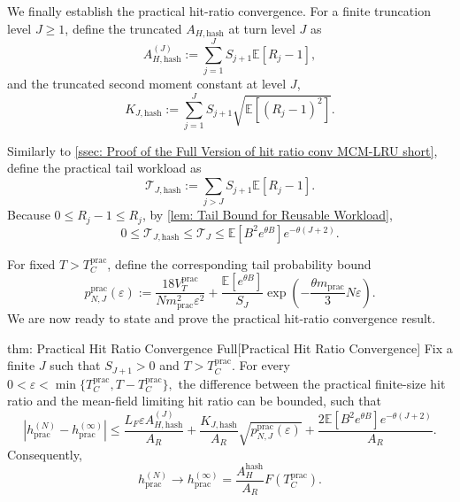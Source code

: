 \documentclass{article}
\theoremstyle{definition}
\newcommand{\E}{\mathbb E}
\begin{document}
We finally establish the practical hit-ratio convergence. For a finite truncation level $J\geq1$, define the truncated $A_{H,\mathrm{hash}}$ at turn level $J$ as 
\begin{equation}
\label{equ: practical truncated AH}
    A_{H,\mathrm{hash}}^{(J)} :=\sum_{j=1}^{J}S_{j+1}\E[R_j-1],
\end{equation}
and the truncated second moment constant at level $J$,
\begin{equation}
\label{equ: practical truncated KJ}
    K_{J,\mathrm{hash}}:=\sum_{j=1}^{J}S_{j+1}\sqrt{\E[(R_j-1)^2]}.
\end{equation}

Similarly to \cref{ssec: Proof of the Full Version of hit ratio conv MCM-LRU short}, define the practical tail workload as
\begin{equation}
\label{equ: practical tail workload}
    \mathcal T_{J,\mathrm{hash}} :=\sum_{j>J}S_{j+1}\E[R_j-1].
\end{equation}
Because $0\leq R_j-1\leq R_j$, by \cref{lem: Tail Bound for Reusable Workload}, 
\begin{equation}
\label{equ: practical tail workload bound}
    0\leq\mathcal T_{J,\mathrm{hash}}\leq\mathcal T_J \leq\E[B^2e^{\theta B}]e^{-\theta(J+2)}.
\end{equation}

For fixed $T>T_C^{\mathrm{prac}}$, define the corresponding tail probability bound 
\begin{equation}
\label{equ: practical pNJ}
    p_{N,J}^{\mathrm{prac}}(\varepsilon) :=\frac{18V_T^{\mathrm{prac}}}{Nm_{\mathrm{prac}}^2\varepsilon^2} + \frac{\E[e^{\theta B}]}{S_J} \exp\left(-\frac{\theta m_{\mathrm{prac}}}{3}N\varepsilon\right).
\end{equation}
We are now ready to state and prove the practical hit-ratio convergence result.

\begin{reptheorem}{thm: Practical Hit Ratio Convergence Full}[Practical Hit Ratio Convergence]
Fix a finite $J$ such that $S_{J+1}>0$ and $T>T_C^{\mathrm{prac}}$. For every $0<\varepsilon<\min\{T_C^{\mathrm{prac}},T-T_C^{\mathrm{prac}}\},$ the difference between the practical finite-size hit ratio and the mean-field limiting hit ratio can be bounded, such that
\begin{equation*}
    \left|h_{ \mathrm{prac}}^{(N)}-h_{ \mathrm{prac}}^{(\infty)}\right| \leq \frac{L_F\varepsilon A_{H,\mathrm{hash}}^{(J)}}{A_R} + \frac{K_{J,\mathrm{hash}}}{A_R}\sqrt{p_{N,J}^{\mathrm{prac}}(\varepsilon)} + \frac{2\E[B^2e^{\theta B}]e^{-\theta(J+2)}}{A_R}.
\end{equation*}
Consequently,
\begin{equation*}
    h_{ \mathrm{prac}}^{(N)}\rightarrow h_{ \mathrm{prac}}^{(\infty)}= \frac{A_H^{\mathrm{hash}}}{A_R} F(T_C^{\mathrm{prac}}).
\end{equation*}
\end{reptheorem}
\end{document}
